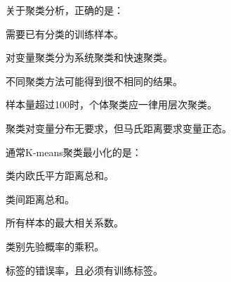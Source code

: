 \par\addvspace{6pt}\noindent\begin{minipage}{\linewidth}


关于聚类分析，正确的是：


\begin{choices}

\item 需要已有分类的训练样本。

\item 对变量聚类分为系统聚类和快速聚类。

\item 不同聚类方法可能得到很不相同的结果。

\item 样本量超过100时，个体聚类应一律用层次聚类。

\item 聚类对变量分布无要求，但马氏距离要求变量正态。

\end{choices}

\end{minipage}\par\vspace{4pt}

\par\addvspace{6pt}\noindent\begin{minipage}{\linewidth}


通常K-means聚类最小化的是：


\begin{choices}

\item 类内欧氏平方距离总和。

\item 类间距离总和。

\item 所有样本的最大相关系数。

\item 类别先验概率的乘积。

\item 标签的错误率，且必须有训练标签。

\end{choices}

\end{minipage}\par\vspace{4pt}

